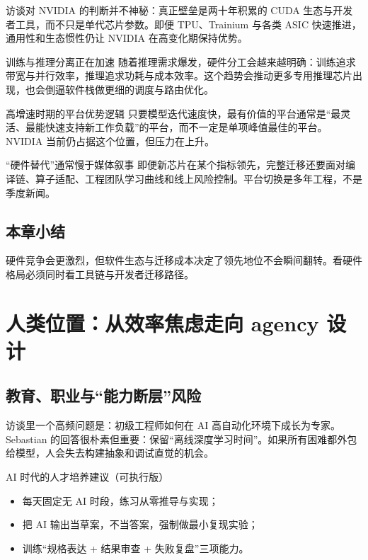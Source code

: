 \documentclass[a4paper]{article}
\begin{document}
访谈对 NVIDIA 的判断并不神秘：真正壁垒是两十年积累的 CUDA 生态与开发者工具，而不只是单代芯片参数。即便 TPU、Trainium 与各类 ASIC 快速推进，通用性和生态惯性仍让 NVIDIA 在高变化期保持优势。

\begin{knowledgebox}{训练与推理分离正在加速}
随着推理需求爆发，硬件分工会越来越明确：训练追求带宽与并行效率，推理追求功耗与成本效率。这个趋势会推动更多专用推理芯片出现，也会倒逼软件栈做更细的调度与路由优化。
\end{knowledgebox}

\begin{importantbox}{高增速时期的平台优势逻辑}
只要模型迭代速度快，最有价值的平台通常是“最灵活、最能快速支持新工作负载”的平台，而不一定是单项峰值最佳的平台。NVIDIA 当前仍占据这个位置，但压力在上升。
\end{importantbox}

\begin{warningbox}{“硬件替代”通常慢于媒体叙事}
即便新芯片在某个指标领先，完整迁移还要面对编译链、算子适配、工程团队学习曲线和线上风险控制。平台切换是多年工程，不是季度新闻。
\end{warningbox}

\subsection{本章小结}

硬件竞争会更激烈，但软件生态与迁移成本决定了领先地位不会瞬间翻转。看硬件格局必须同时看工具链与开发者迁移路径。

\section{人类位置：从效率焦虑走向 agency 设计}

\subsection{教育、职业与“能力断层”风险}

访谈里一个高频问题是：初级工程师如何在 AI 高自动化环境下成长为专家。Sebastian 的回答很朴素但重要：保留“离线深度学习时间”。如果所有困难都外包给模型，人会失去构建抽象和调试直觉的机会。

\begin{importantbox}{AI 时代的人才培养建议（可执行版）}
\begin{itemize}[leftmargin=1.5em]
    \item 每天固定无 AI 时段，练习从零推导与实现；
    \item 把 AI 输出当草案，不当答案，强制做最小复现实验；
    \item 训练“规格表达 + 结果审查 + 失败复盘”三项能力。
\end{itemize}
\end{importantbox}
\end{document}
